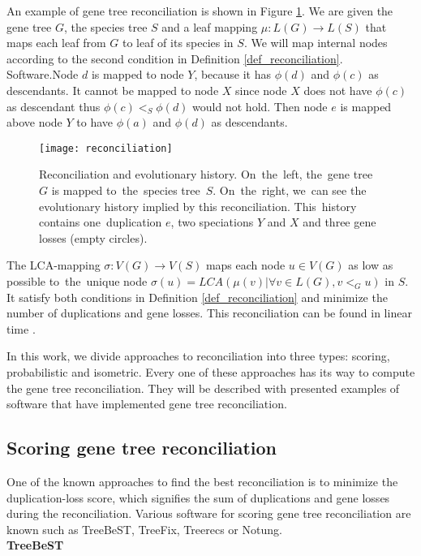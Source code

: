 An example of gene tree reconciliation is shown in Figure \ref{reconciliation}. We are given the gene tree $G$, the species tree $S$ and a leaf mapping $\mu: L(G) \rightarrow L(S)$ that maps each leaf from $G$ to leaf of its species in $S$. We will map internal nodes according to the second condition in Definition \ref{def_reconciliation}. Software.Node $d$ is mapped to node $Y$, because it has $\phi(d)$ and $\phi(c)$ as descendants. It cannot be mapped to node $X$ since node $X$ does not have $\phi(c)$ as descendant thus $\phi(c)<_S\phi(d)$ would not hold. Then node $e$ is mapped above node $Y$ to have $\phi(a)$ and $\phi(d)$ as descendants.

\begin{figure}[ht]
	\centering
	\label{reconciliation}
  	\texttt{[image: reconciliation]}
  	\caption[Reconciliation and evolutionary history]{Reconciliation and evolutionary history. On~the~left, the~gene tree~$G$ is mapped to~the~species tree~$S$. On~the~right, we~can see the evolutionary history implied by this reconciliation. This~history contains one~duplication $e$, two speciations $Y$ and $X$ and three gene losses (empty circles).}
\end{figure}

The LCA-mapping $\sigma: V(G) \rightarrow V(S)$ maps each node $u \in V(G)$ as low as possible to~the~unique node $\sigma(u) = LCA(\mu(v) | \forall v \in L(G), v<_Gu)$ in $S$. It satisfy both conditions in Definition \ref{def_reconciliation} and minimize the number of duplications and gene losses. This reconciliation can be found in linear time \cite{hasic}.

In this work, we divide approaches to reconciliation into three types: scoring, probabilistic and isometric. Every one of these approaches has its way to compute the gene tree reconciliation. They will be described with presented examples of software that have implemented gene tree reconciliation. 

\subsection{Scoring gene tree reconciliation}
One of the known approaches to find the best reconciliation is to minimize the duplication-loss score, which signifies the sum of duplications and gene losses during the reconciliation. Various software for scoring gene tree reconciliation are known such as TreeBeST, TreeFix, Treerecs or Notung.\\
\textbf{TreeBeST} 

